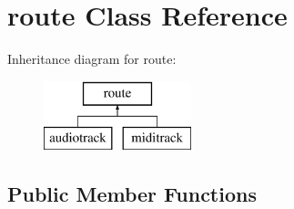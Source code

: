 \hypertarget{classroute}{}\section{route Class Reference}
\label{classroute}
Inheritance diagram for route\+:\begin{figure}[H]
\begin{center}
\leavevmode
\includegraphics[height=2.000000cm]{classroute}
\end{center}
\end{figure}
\subsection*{Public Member Functions}
